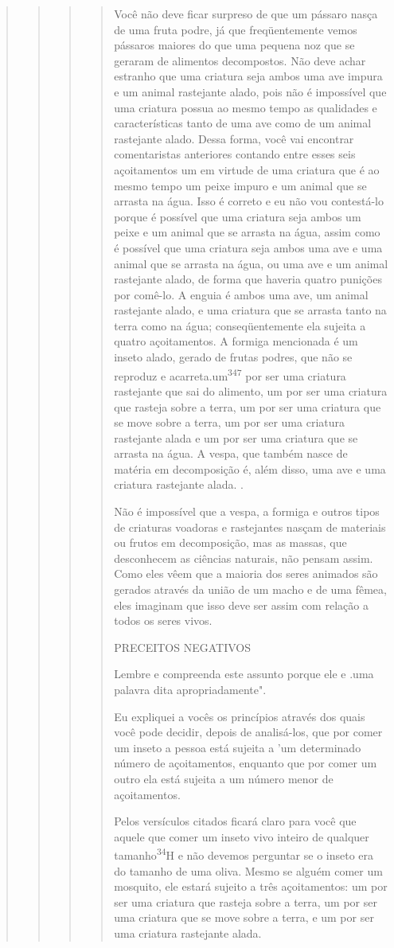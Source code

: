 \begin{quote}
\begin{quote}
\begin{quote}
\begin{quote}
Você não deve ficar surpreso de que um pássaro nasça de uma fruta podre,
já que freqüentemente vemos pássaros maiores do que uma pequena noz que
se geraram de alimentos decompostos. Não deve achar estranho que uma
criatura seja ambos uma ave impura e um animal rastejante alado, pois
não é impossível que uma criatura possua ao mesmo tempo as qualidades e
caracte­rísticas tanto de uma ave como de um animal rastejante alado.
Dessa forma, você vai encontrar comentaristas anteriores contando entre
esses seis açoita­mentos um em virtude de uma criatura que é ao mesmo
tempo um peixe impu­ro e um animal que se arrasta na água. Isso é
correto e eu não vou contestá-lo porque é possível que uma criatura seja
ambos um peixe e um animal que se arrasta na água, assim como é possível
que uma criatura seja ambos uma ave e uma animal que se arrasta na água,
ou uma ave e um animal rastejante alado, de forma que haveria quatro
punições por comê-lo. A enguia é ambos uma ave, um animal rastejante
alado, e uma criatura que se arrasta tanto na terra como na água;
conseqüentemente ela sujeita a quatro açoitamentos. A formiga
men­cionada é um inseto alado, gerado de frutas podres, que não se
reproduz e acar­reta.um\textsuperscript{347} por ser
uma criatura rastejante que sai do alimento, um por ser uma criatura que
rasteja sobre a terra, um por ser uma criatura que se move sobre a
terra, um por ser uma criatura rastejante alada e um por ser uma
criatura que se arrasta na água. A vespa, que também nasce de matéria em
decomposição é, além disso, uma ave e uma criatura rastejante alada. .

Não é impossível que a vespa, a formiga e outros tipos de criaturas
voadoras e rastejantes nasçam de materiais ou frutos em decomposição,
mas as massas, que desconhecem as ciências naturais, não pensam assim.
Como eles vêem que a maioria dos seres animados são gerados através da
união de um macho e de uma fêmea, eles imaginam que isso deve ser assim
com relação a todos os seres vivos.

PRECEITOS NEGATIVOS

Lembre e compreenda este assunto porque ele e .uma
palavra dita apropriadamente".

Eu expliquei a vocês os princípios através dos quais você pode deci­dir,
depois de analisá-los, que por comer um inseto a pessoa está sujeita a
'um determinado número de açoitamentos, enquanto que por comer um outro
ela está sujeita a um número menor de açoitamentos.

Pelos versículos citados ficará claro para você que aquele que co­mer um
inseto vivo inteiro de qualquer tamanho\textsuperscript{34}H e não
devemos perguntar se o inseto era do tamanho de uma oliva. Mesmo se
alguém comer um mosqui­to, ele estará sujeito a três açoitamentos: um
por ser uma criatura que rasteja sobre a terra, um por ser uma criatura
que se move sobre a terra, e um por ser uma criatura rastejante alada.


\end{quote}
\end{quote}
\end{quote}
\end{quote}
